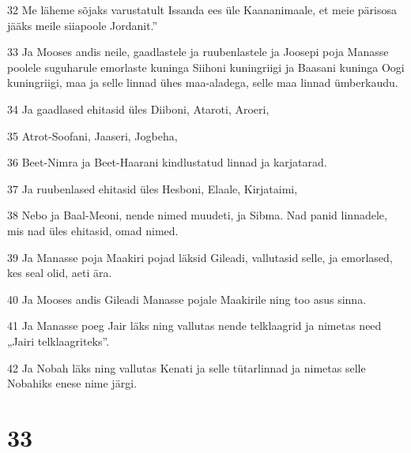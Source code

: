 \par 32 Me läheme sõjaks varustatult Issanda ees üle Kaananimaale, et meie pärisosa jääks meile siiapoole Jordanit.”
\par 33 Ja Mooses andis neile, gaadlastele ja ruubenlastele ja Joosepi poja Manasse poolele suguharule emorlaste kuninga Siihoni kuningriigi ja Baasani kuninga Oogi kuningriigi, maa ja selle linnad ühes maa-aladega, selle maa linnad ümberkaudu.
\par 34 Ja gaadlased ehitasid üles Diiboni, Ataroti, Aroeri,
\par 35 Atrot-Soofani, Jaaseri, Jogbeha,
\par 36 Beet-Nimra ja Beet-Haarani kindlustatud linnad ja karjatarad.
\par 37 Ja ruubenlased ehitasid üles Hesboni, Elaale, Kirjataimi,
\par 38 Nebo ja Baal-Meoni, nende nimed muudeti, ja Sibma. Nad panid linnadele, mis nad üles ehitasid, omad nimed.
\par 39 Ja Manasse poja Maakiri pojad läksid Gileadi, vallutasid selle, ja emorlased, kes seal olid, aeti ära.
\par 40 Ja Mooses andis Gileadi Manasse pojale Maakirile ning too asus sinna.
\par 41 Ja Manasse poeg Jair läks ning vallutas nende telklaagrid ja nimetas need „Jairi telklaagriteks”.
\par 42 Ja Nobah läks ning vallutas Kenati ja selle tütarlinnad ja nimetas selle Nobahiks enese nime järgi.

\chapter{33}

